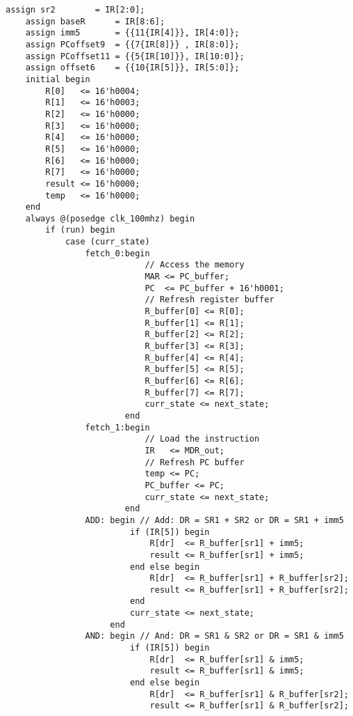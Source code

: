 \documentclass[UTF8,fontset=fandol]{ctexart}
\begin{document}
\begin{lstlisting}[style = verilogstyle, caption = 模块文件源代码, label = Code:Source, breaklines = true]
    assign sr2        = IR[2:0];
    assign baseR      = IR[8:6];
    assign imm5       = {{11{IR[4]}}, IR[4:0]};
    assign PCoffset9  = {{7{IR[8]}} , IR[8:0]};
    assign PCoffset11 = {{5{IR[10]}}, IR[10:0]};
    assign offset6    = {{10{IR[5]}}, IR[5:0]};
    initial begin
        R[0]   <= 16'h0004;
        R[1]   <= 16'h0003;
        R[2]   <= 16'h0000;
        R[3]   <= 16'h0000;
        R[4]   <= 16'h0000;
        R[5]   <= 16'h0000;
        R[6]   <= 16'h0000;
        R[7]   <= 16'h0000;
        result <= 16'h0000;
        temp   <= 16'h0000;
    end
    always @(posedge clk_100mhz) begin
        if (run) begin
            case (curr_state)
                fetch_0:begin
                            // Access the memory
                            MAR <= PC_buffer;
                            PC  <= PC_buffer + 16'h0001;
                            // Refresh register buffer
                            R_buffer[0] <= R[0];
                            R_buffer[1] <= R[1];
                            R_buffer[2] <= R[2];
                            R_buffer[3] <= R[3];
                            R_buffer[4] <= R[4];
                            R_buffer[5] <= R[5];
                            R_buffer[6] <= R[6];
                            R_buffer[7] <= R[7];
                            curr_state <= next_state;
                        end
                fetch_1:begin
                            // Load the instruction
                            IR   <= MDR_out;
                            // Refresh PC buffer
                            temp <= PC;
                            PC_buffer <= PC;
                            curr_state <= next_state;
                        end
                ADD: begin // Add: DR = SR1 + SR2 or DR = SR1 + imm5
                         if (IR[5]) begin
                             R[dr]  <= R_buffer[sr1] + imm5;
                             result <= R_buffer[sr1] + imm5;
                         end else begin
                             R[dr]  <= R_buffer[sr1] + R_buffer[sr2];
                             result <= R_buffer[sr1] + R_buffer[sr2];
                         end
                         curr_state <= next_state;
                     end
                AND: begin // And: DR = SR1 & SR2 or DR = SR1 & imm5 
                         if (IR[5]) begin
                             R[dr]  <= R_buffer[sr1] & imm5;
                             result <= R_buffer[sr1] & imm5;
                         end else begin
                             R[dr]  <= R_buffer[sr1] & R_buffer[sr2];
                             result <= R_buffer[sr1] & R_buffer[sr2];

\end{lstlisting}
\end{document}
